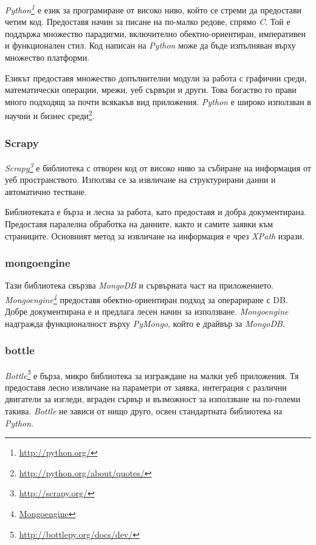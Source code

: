 		\emph{Python\footnote{\url{http://python.org/}}} е език за програмиране от високо ниво, който се стреми да предостави четим код. Предоставя начин за писане на по-малко редове, спрямо \emph{C}. Той е поддържа множество парадигми, включително обектно-ориентиран, императивен и функционален стил. Код написан на \emph{Python} може да бъде изпълняван върху множество платформи. 
		
		Езикът предоставя множество допълнителни модули за работа с графични среди, математически операции, мрежи, уеб сървъри и други. Това богаство го прави много подходящ за почти всякакъв вид приложения. \emph{Python} е широко използван в научни и бизнес среди\footnote{\url{http://python.org/about/quotes/}}.
		
		\subsubsection{Scrapy}

		\emph{Scrapy\footnote{\url{http://scrapy.org/}}} е библиотека с отворен код от високо ниво за събиране на информация от уеб пространството. Използва се за извличане на структурирани данни и автоматично тестване.
		
		Библиотеката е бърза и лесна за работа, като предоставя и добра документирана. Предоставя паралелна обработка на данните, както и самите заявки към страниците. Основният метод за извличане на информация е чрез \emph{XPath} изрази.
		
		\subsubsection{mongoengine}

		Тази библиотека свързва \emph{MongoDB} и сървърната част на приложението. \emph{Mongoengine\footnote{\url{Mongoengine}}} предоставя обектно-ориентиран подход за операриране с \ac{DB}. Добре документирана е и предлага лесен начин за използване. \emph{Mongoengine} надгражда функционалност върху \emph{PyMongo}, който е драйвър за \emph{MongoDB}.
		
		\subsubsection{bottle}

		\emph{Bottle\footnote{\url{http://bottlepy.org/docs/dev/}}} е бърза, микро библиотека за изграждане на малки уеб приложения. Тя предоставя лесно извличане на параметри от заявка, интеграция с различни двигатели за изгледи, вграден сървър и възможност за използване на по-големи такива. \emph{Bottle} не зависи от нищо друго, освен стандартната библиотека на \emph{Python}. 
		
